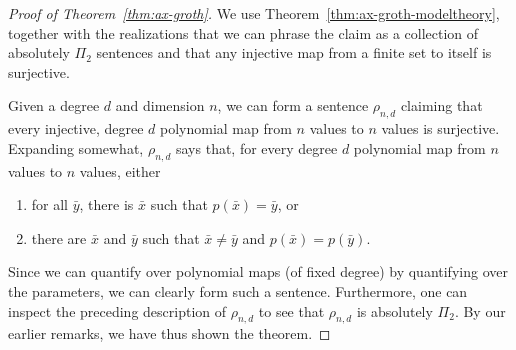 \documentclass{article}
\theoremstyle{plain}
\theoremstyle{definition}
\newcommand{\tuple}{\bar}
\begin{document}
\begin{proof}[Proof of Theorem~\ref{thm:ax-groth}]
  We use Theorem~\ref{thm:ax-groth-modeltheory}, together with the
  realizations that we can phrase the claim as a collection of
  absolutely $\Pi_2$ sentences and that any injective map from a
  finite set to itself is surjective.

  Given a degree $d$ and dimension $n$, we can form a sentence
  $\rho_{n,d}$ claiming that every injective, degree $d$ polynomial
  map from $n$ values to $n$ values is surjective. Expanding somewhat,
  $\rho_{n,d}$ says that, for every degree $d$ polynomial map from $n$
  values to $n$ values, either
  \begin{enumerate}
  \item for all $\tuple{y}$, there is $\tuple{x}$ such that $p(\tuple{x}) = \tuple{y}$, or
  \item there are $\tuple{x}$ and $\tuple{y}$ such that $\tuple{x}
    \neq \tuple{y}$ and $p(\tuple{x}) = p(\tuple{y})$.
  \end{enumerate}
  Since we can quantify over polynomial maps (of fixed degree) by
  quantifying over the parameters, we can clearly form such a
  sentence. Furthermore, one can inspect the preceding description of
  $\rho_{n,d}$ to see that $\rho_{n,d}$ is absolutely $\Pi_2$. By our
  earlier remarks, we have thus shown the theorem.
\end{proof}
\end{document}
